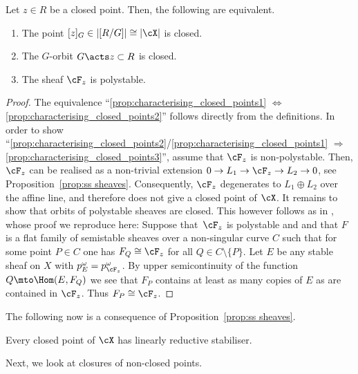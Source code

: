 \begin{Prop}\label{prop:characterising_closed_points}
Let $z \in R$ be a closed point. Then, the following are equivalent.
\begin{enumerate}
\item\label{prop:characterising_closed_points1} The point $[z]_G \in |[R/G]| \cong |\cX|$ is closed.
\item\label{prop:characterising_closed_points2} The $G$-orbit $G\acts z \subset R$ is closed.
\item\label{prop:characterising_closed_points3} The sheaf $\cF_z$ is polystable.
\end{enumerate}
\end{Prop}
\begin{proof}
The equivalence ``\eqref{prop:characterising_closed_points1} $\Leftrightarrow$ \eqref{prop:characterising_closed_points2}'' follows directly from the definitions. In order to show ``\eqref{prop:characterising_closed_points2}/\eqref{prop:characterising_closed_points1} $\Rightarrow$ \eqref{prop:characterising_closed_points3}'', assume that $\cF_z$ is non-polystable. Then, $\cF_z$ can be realised as a non-trivial extension $0 \to L_1 \to \cF_z \to L_2 \to 0$, see Proposition~\ref{prop:ss sheaves}. Consequently, $\cF_z$ degenerates to $L_1 \oplus L_2$ over the affine line, and therefore does not give a closed point of $\cX$. It remains to show that orbits of polystable sheaves are closed. This however follows as in \cite[Lem.\,4.7]{Gieseker}, whose proof we reproduce here: Suppose that~$\cF_z$ is polystable and and that $F$ is a flat family of semistable sheaves over a non-singular curve $C$ such that for some point $P\in C$ one has $F_Q\cong\cF_z$ for all $Q\in C\setminus\{ P\}$. Let $E$ be any stable sheaf on $X$ with $p^\omega_E=p^\omega_{\cF_z}$. By upper semicontinuity of the function $Q\mto \Hom(E, F_Q)$ we see that $F_P$ contains at least as many copies of $E$ as are contained in $\cF_z$. Thus $F_P\cong \cF_z$.
\end{proof}
The following now is a consequence of Proposition~\ref{prop:ss sheaves}.
\begin{cor}\label{cor:reductive_stabiliser}
Every closed point of $\cX$ has linearly reductive stabiliser.
\end{cor}
Next, we look at closures of non-closed points.

